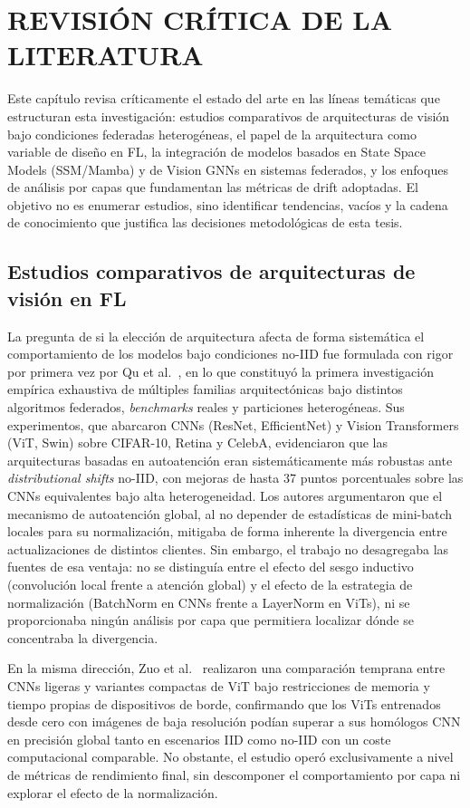 \chapter{REVISI\'ON CR\'ITICA DE LA LITERATURA}

Este capítulo revisa críticamente el estado del arte en las líneas temáticas que estructuran esta 
investigación: estudios comparativos de arquitecturas de visión bajo condiciones
federadas heterogéneas, el papel de la arquitectura como variable de diseño en FL, la integración
de modelos basados en State Space Models (SSM/Mamba) y de Vision GNNs en sistemas federados,
y los enfoques de análisis por capas que fundamentan las métricas de drift adoptadas.
El objetivo no es enumerar estudios, sino identificar tendencias, vacíos y la cadena de conocimiento
que justifica las decisiones metodológicas de esta tesis.


\section{Estudios comparativos de arquitecturas de visión en FL}

La pregunta de si la elección de arquitectura afecta de forma sistemática el comportamiento de los
modelos bajo condiciones no-IID fue formulada con rigor por primera vez por Qu et al.\
\cite{qu2022rethinking}, en lo que constituyó la primera investigación empírica exhaustiva de
múltiples familias arquitectónicas bajo distintos algoritmos federados, \textit{benchmarks} reales
y particiones heterogéneas.
Sus experimentos, que abarcaron CNNs (ResNet, EfficientNet) y Vision Transformers (ViT, Swin)
sobre CIFAR-10, Retina y CelebA, evidenciaron que las arquitecturas basadas en autoatención eran
sistemáticamente más robustas ante \textit{distributional shifts} no-IID, con mejoras de hasta 37
puntos porcentuales sobre las CNNs equivalentes bajo alta heterogeneidad.
Los autores argumentaron que el mecanismo de autoatención global, al no depender de estadísticas
de mini-batch locales para su normalización, mitigaba de forma inherente la divergencia entre
actualizaciones de distintos clientes.
Sin embargo, el trabajo no desagregaba las fuentes de esa ventaja: no se distinguía entre el
efecto del sesgo inductivo (convolución local frente a atención global) y el efecto de la estrategia
de normalización (BatchNorm en CNNs frente a LayerNorm en ViTs), ni se proporcionaba ningún
análisis por capa que permitiera localizar dónde se concentraba la divergencia.

En la misma dirección, Zuo et al.\ \cite{zuo2022empirical} realizaron una comparación temprana
entre CNNs ligeras y variantes compactas de ViT bajo restricciones de memoria y tiempo propias
de dispositivos de borde, confirmando que los ViTs entrenados desde cero con imágenes de baja
resolución podían superar a sus homólogos CNN en precisión global tanto en escenarios IID como
no-IID con un coste computacional comparable.
No obstante, el estudio operó exclusivamente a nivel de métricas de rendimiento final, sin
descomponer el comportamiento por capa ni explorar el efecto de la normalización.

